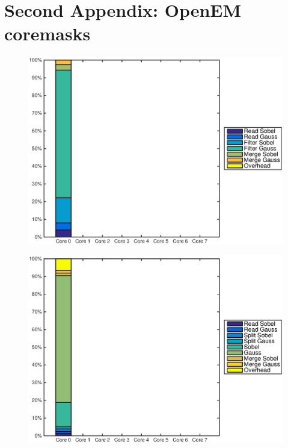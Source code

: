 \chapter{Second Appendix: OpenEM coremasks}
\begin{figure}
    \centering
    \begin{minipage}{0.45\textwidth}
        \centering
        \includegraphics[width=0.99\linewidth]{images/openem_cifcif_1cores_eo.eps}
        \label{fig:oem1coreeo}
    \end{minipage}
    \hfill
    \begin{minipage}{0.45\textwidth}
        \centering
        \includegraphics[width=0.99\linewidth]{images/openem_cifcif_1cores_func.eps}
        \label{fig:oem1corefunc}
    \end{minipage}%
\end{figure}
